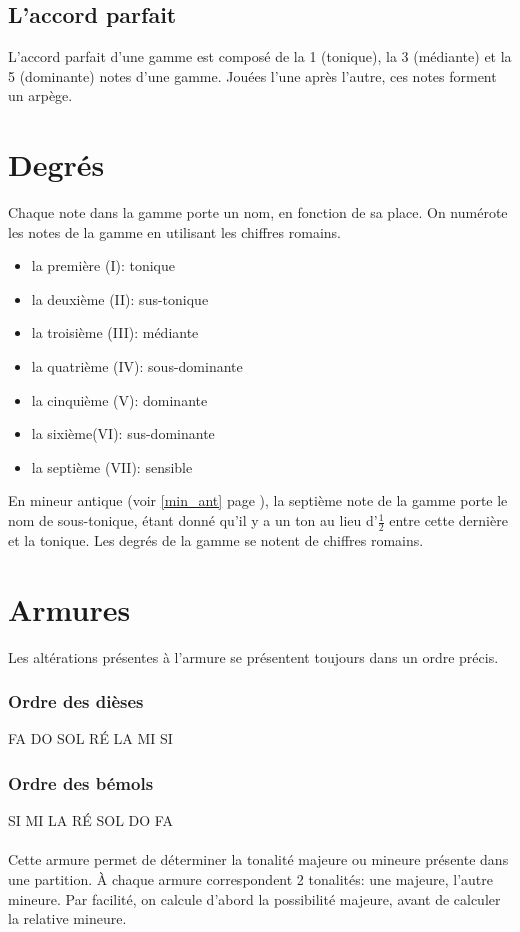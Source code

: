 \documentclass[11pt,a4paper]{scrreprt}
\begin{document}

\subsection{L'accord parfait}
L'accord parfait d'une gamme est composé de la 1\iere{} (tonique), la 3\ieme{} (médiante) et la 5\ieme{} (dominante) notes d'une gamme. Jouées l'une après l'autre, ces notes forment un arpège.

\section{Degrés}
Chaque note dans la gamme porte un nom, en fonction de sa place. On numérote les notes de la gamme en utilisant les chiffres romains.
\begin{itemize}
\item la première (I): tonique
\item la deuxième (II): sus-tonique
\item la troisième (III): médiante
\item la quatrième (IV): sous-dominante
\item la cinquième (V): dominante
\item la sixième(VI): sus-dominante
\item la septième (VII): sensible
\end{itemize}

En mineur antique (voir \ref{min_ant} page \pageref{min_ant}), la septième note de la gamme porte le nom de sous-tonique, étant donné qu'il y a un ton au lieu d'$\frac1 2$ entre cette dernière et la tonique. Les degrés de la gamme se notent de chiffres romains.

\section{Armures}
Les altérations présentes à l'armure se présentent toujours dans un ordre précis.
\subsubsection{Ordre des dièses}
FA DO SOL RÉ LA MI SI
\subsubsection{Ordre des bémols}
SI MI LA RÉ SOL DO FA
\\
\\
Cette armure permet de déterminer la tonalité majeure ou mineure présente dans une partition. À chaque armure correspondent 2 tonalités: une majeure, l'autre mineure. Par facilité, on calcule d'abord la possibilité majeure, avant de calculer la relative mineure.
\end{document}
